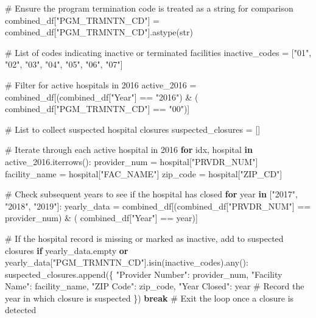 \documentclass[
  letterpaper,
  DIV=11,
  numbers=noendperiod]{scrartcl}
\newenvironment{Shaded}{\begin{snugshade}}{\end{snugshade}}
\newcommand{\BuiltInTok}[1]{\textcolor[rgb]{0.00,0.23,0.31}{#1}}
\newcommand{\CommentTok}[1]{\textcolor[rgb]{0.37,0.37,0.37}{#1}}
\newcommand{\ControlFlowTok}[1]{\textcolor[rgb]{0.00,0.23,0.31}{\textbf{#1}}}
\newcommand{\KeywordTok}[1]{\textcolor[rgb]{0.00,0.23,0.31}{\textbf{#1}}}
\newcommand{\NormalTok}[1]{\textcolor[rgb]{0.00,0.23,0.31}{#1}}
\newcommand{\OperatorTok}[1]{\textcolor[rgb]{0.37,0.37,0.37}{#1}}
\newcommand{\StringTok}[1]{\textcolor[rgb]{0.13,0.47,0.30}{#1}}
\begin{document}
\begin{Shaded}
\begin{Highlighting}[]
\CommentTok{\# Ensure the program termination code is treated as a string for comparison}
\NormalTok{combined\_df[}\StringTok{"PGM\_TRMNTN\_CD"}\NormalTok{] }\OperatorTok{=}\NormalTok{ combined\_df[}\StringTok{"PGM\_TRMNTN\_CD"}\NormalTok{].astype(}\BuiltInTok{str}\NormalTok{)}

\CommentTok{\# List of codes indicating inactive or terminated facilities}
\NormalTok{inactive\_codes }\OperatorTok{=}\NormalTok{ [}\StringTok{"01"}\NormalTok{, }\StringTok{"02"}\NormalTok{, }\StringTok{"03"}\NormalTok{, }\StringTok{"04"}\NormalTok{, }\StringTok{"05"}\NormalTok{, }\StringTok{"06"}\NormalTok{, }\StringTok{"07"}\NormalTok{]}

\CommentTok{\# Filter for active hospitals in 2016}
\NormalTok{active\_2016 }\OperatorTok{=}\NormalTok{ combined\_df[(combined\_df[}\StringTok{"Year"}\NormalTok{] }\OperatorTok{==} \StringTok{"2016"}\NormalTok{) }\OperatorTok{\&}\NormalTok{ (}
\NormalTok{    combined\_df[}\StringTok{"PGM\_TRMNTN\_CD"}\NormalTok{] }\OperatorTok{==} \StringTok{"00"}\NormalTok{)]}

\CommentTok{\# List to collect suspected hospital closures}
\NormalTok{suspected\_closures }\OperatorTok{=}\NormalTok{ []}

\CommentTok{\# Iterate through each active hospital in 2016}
\ControlFlowTok{for}\NormalTok{ idx, hospital }\KeywordTok{in}\NormalTok{ active\_2016.iterrows():}
\NormalTok{    provider\_num }\OperatorTok{=}\NormalTok{ hospital[}\StringTok{"PRVDR\_NUM"}\NormalTok{]}
\NormalTok{    facility\_name }\OperatorTok{=}\NormalTok{ hospital[}\StringTok{"FAC\_NAME"}\NormalTok{]}
\NormalTok{    zip\_code }\OperatorTok{=}\NormalTok{ hospital[}\StringTok{"ZIP\_CD"}\NormalTok{]}

    \CommentTok{\# Check subsequent years to see if the hospital has closed}
    \ControlFlowTok{for}\NormalTok{ year }\KeywordTok{in}\NormalTok{ [}\StringTok{"2017"}\NormalTok{, }\StringTok{"2018"}\NormalTok{, }\StringTok{"2019"}\NormalTok{]:}
\NormalTok{        yearly\_data }\OperatorTok{=}\NormalTok{ combined\_df[(combined\_df[}\StringTok{"PRVDR\_NUM"}\NormalTok{] }\OperatorTok{==}\NormalTok{ provider\_num) }\OperatorTok{\&}\NormalTok{ (}
\NormalTok{            combined\_df[}\StringTok{"Year"}\NormalTok{] }\OperatorTok{==}\NormalTok{ year)]}

        \CommentTok{\# If the hospital record is missing or marked as inactive, add to suspected closures}
        \ControlFlowTok{if}\NormalTok{ yearly\_data.empty }\KeywordTok{or}\NormalTok{ yearly\_data[}\StringTok{"PGM\_TRMNTN\_CD"}\NormalTok{].isin(inactive\_codes).}\BuiltInTok{any}\NormalTok{():}
\NormalTok{            suspected\_closures.append(\{}
                \StringTok{"Provider Number"}\NormalTok{: provider\_num,}
                \StringTok{"Facility Name"}\NormalTok{: facility\_name,}
                \StringTok{"ZIP Code"}\NormalTok{: zip\_code,}
                \StringTok{"Year Closed"}\NormalTok{: year  }\CommentTok{\# Record the year in which closure is suspected}
\NormalTok{            \})}
            \ControlFlowTok{break}  \CommentTok{\# Exit the loop once a closure is detected}


\end{Highlighting}
\end{Shaded}
\end{document}
